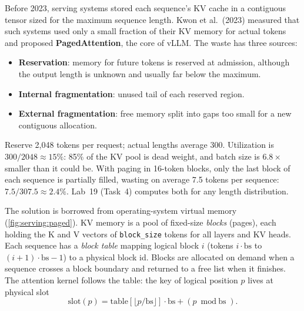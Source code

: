 Before 2023, serving systems stored each sequence's KV cache in a contiguous tensor sized for the
maximum sequence length. Kwon et al.\ (2023) measured that such systems used only a small fraction
of their KV memory for actual tokens and proposed \textbf{PagedAttention}, the core of vLLM. The
waste has three sources:
\begin{itemize}
  \item \textbf{Reservation}: memory for future tokens is reserved at admission, although the output
    length is unknown and usually far below the maximum.
  \item \textbf{Internal fragmentation}: unused tail of each reserved region.
  \item \textbf{External fragmentation}: free memory split into gaps too small for a new contiguous
    allocation.
\end{itemize}

\begin{napkinmath}
Reserve 2,048 tokens per request; actual lengths average 300. Utilization is $300/2048\approx15\%$:
85\% of the KV pool is dead weight, and batch size is $6.8\times$ smaller than it could be. With paging
in 16-token blocks, only the last block of each sequence is partially filled, wasting on average 7.5
tokens per sequence: $7.5/307.5\approx2.4\%$. Lab~19 (Task~4) computes both for any length distribution.
\end{napkinmath}

The solution is borrowed from operating-system virtual memory (\cref{fig:serving:paged}). KV memory
is a pool of fixed-size \emph{blocks} (pages), each holding the K and V vectors of \texttt{block\_size}
tokens for all layers and KV heads. Each sequence has a \emph{block table} mapping logical block $i$
(tokens $i\cdot\text{bs}$ to $(i+1)\cdot\text{bs}-1$) to a physical block id. Blocks are allocated
on demand when a sequence crosses a block boundary and returned to a free list when it finishes. The
attention kernel follows the table: the key of logical position $p$ lives at physical slot
\begin{equation}\label{eq:serving:slot}
  \text{slot}(p) = \text{table}[\lfloor p/\text{bs}\rfloor]\cdot\text{bs} + (p \bmod \text{bs}).
\end{equation}

